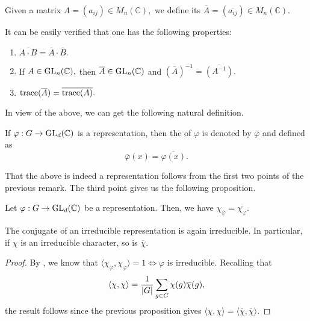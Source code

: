 \begin{defn}%
	Given a matrix $A = (a_{ij}) \in M_n(\mathbb{C}),$ we define its  $\overline{A} = (\overline{a_{ij}}) \in M_n(\mathbb{C}).$
\end{defn}

\begin{rem}
	It can be easily verified that one has the following properties:
	\begin{enumerate}
		\item $\overline{A \cdot B} = \overline{A} \cdot \overline{B}.$
		\item If $A \in \operatorname{GL}_n(\mathbb{C}),$ then $\overline{A} \in \operatorname{GL}_n(\mathbb{C})$ and $\left(\overline{A}\right)^{-1} = \overline{\left(A^{-1}\right)}.$
		\item $\operatorname{trace}(\overline{A}) = \overline{\operatorname{trace}(A)}.$
	\end{enumerate}
\end{rem}

In view of the above, we can get the following natural definition.

\begin{defn}%
	If $\varphi : G \to \operatorname{GL}_d(\mathbb{C})$ is a representation, then the  of $\varphi$ is denoted by $\overline{\varphi}$ and defined as
	\begin{equation*} 
		\overline{\varphi}(x) = \overline{\varphi(x)}.
	\end{equation*}
\end{defn}
That the above is indeed a representation follows from the first two points of the previous remark. The third point gives us the following proposition.

\begin{prop}
	Let $\varphi : G \to \operatorname{GL}_d(\mathbb{C})$ be a representation. Then, we have $\chi_{\overline{\varphi}} = \overline{\chi_\varphi}.$
\end{prop}

\begin{cor} \label{cor:conjofcharischar}
	The conjugate of an irreducible representation is again irreducible. In particular, if $\chi$ is an irreducible character, so is $\overline{\chi}.$
\end{cor}
\begin{proof} 
	By , we know that $\langle \chi_\varphi, \chi_\varphi\rangle = 1 \iff \varphi$ is irreducible. Recalling that
	\begin{equation*} 
		\langle \chi, \chi\rangle = \frac{1}{{\left\lvert G \right\lvert}}\sum_{g \in G}\chi(g)\overline{\chi}(g),
	\end{equation*}
	the result follows since the previous proposition gives $\langle \chi, \chi\rangle = \langle \overline{\chi}, \overline{\chi}\rangle.$
\end{proof}

